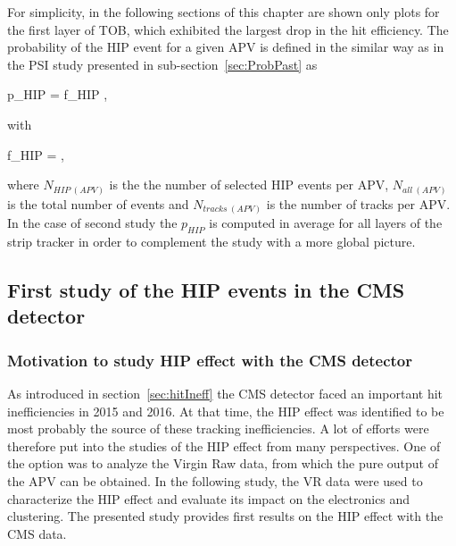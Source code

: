 
For simplicity, in the following sections of this chapter are shown only plots for the first layer of TOB, which exhibited the largest drop in the hit efficiency. The probability of the HIP event for a given APV is defined in the similar way as in the PSI study presented in sub-section~\ref{sec:ProbPast} as


{
p_{HIP} = f_{HIP} ,
}

with


{
f_{HIP} = ,
}


where $N_{HIP~(APV)}$ is the the number of selected HIP events per APV, $N_{all~(APV)}$ is the total number of events and $N_{tracks~(APV)}$ is the number of tracks per APV. In the case of second study the $p_{HIP}$ is computed in average for all layers of the strip tracker in order to complement the study with a more global picture.


\subsection{First study of the HIP events in the CMS detector~\label{sec:firstStudy}}

\subsubsection{Motivation to study HIP effect with the CMS detector}

As introduced in section~\ref{sec:hitIneff} the CMS detector faced an important hit inefficiencies in 2015 and 2016. At that time, the HIP effect was identified to be most probably the source of these tracking inefficiencies. A lot of efforts were therefore put into the studies of the HIP effect from many perspectives. One of the option was to analyze the Virgin Raw data, from which the pure output of the APV can be obtained. In the following study, the VR data were used to characterize the HIP effect and evaluate its impact on the electronics and clustering. The presented study provides first results on the HIP effect with the CMS data.

